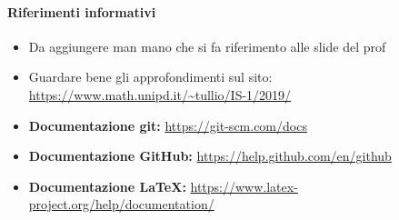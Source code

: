 		\paragraph{Riferimenti informativi}
			\begin{itemize}
				\item Da aggiungere man mano che si fa riferimento alle slide del prof
				\item Guardare bene gli approfondimenti sul sito:
				\url{https://www.math.unipd.it/~tullio/IS-1/2019/}
				\item \textbf{Documentazione git: }\url{https://git-scm.com/docs} 
				\item \textbf{Documentazione GitHub: }\url{https://help.github.com/en/github}
				\item \textbf{Documentazione LaTeX: }\url{https://www.latex-project.org/help/documentation/}
			\end{itemize}
		

